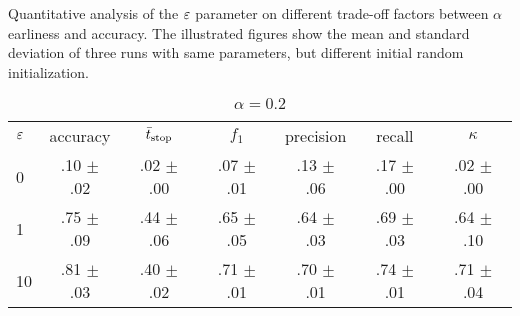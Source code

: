 \begin{frame}


\begin{table}
	\caption{Quantitative analysis of the $\varepsilon$ parameter on different trade-off factors between $\alpha$ earliness and accuracy. The illustrated figures show the mean and standard deviation of three runs with same parameters, but different initial random initialization.}
	\label{tab:epsilon:quantitative}
	\setlength{\belowcaptionskip}{0pt}
	
	\begin{subtable}{.5\textwidth}
		\scriptsize
		\hspace{-1em}\begin{tabular}{lcccccc}
			\toprule
			\textbf{$\varepsilon$} & accuracy & $\bar{t}_\text{stop}$  & $f_1$ & precision & recall & $\kappa$ \\
			\cmidrule(lr){0-0}\cmidrule(lr){1-1}\cmidrule(lr){2-2}\cmidrule(lr){3-3}\cmidrule(lr){4-4}\cmidrule(lr){5-5}\cmidrule(lr){6-6}\cmidrule(lr){7-7}
			0 & .10 $\pm$ .02 & .02 $\pm$ .00 & .07 $\pm$ .01 & .13 $\pm$ .06 & .17 $\pm$ .00 & .02 $\pm$ .00 \\
			1 & .75 $\pm$ .09 & .44 $\pm$ .06 & .65 $\pm$ .05 & .64 $\pm$ .03 & .69 $\pm$ .03 & .64 $\pm$ .10 \\
			10 & .81 $\pm$ .03 & .40 $\pm$ .02 & .71 $\pm$ .01 & .70 $\pm$ .01 & .74 $\pm$ .01 & .71 $\pm$ .04 \\
			\bottomrule
		\end{tabular}
		\caption{\emph{$\alpha=0.2$}}
		\label{tab:epsilon:a02}
	\end{subtable}
	\begin{subtable}{.5\textwidth}

\end{subtable}
\end{table}
\end{frame}
